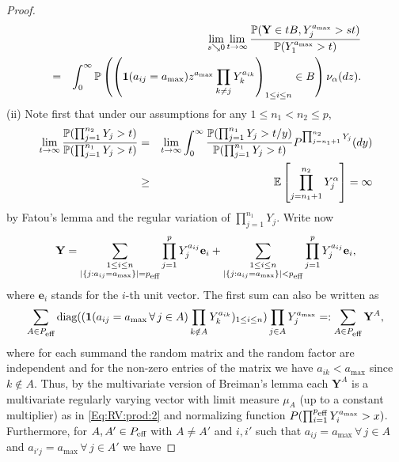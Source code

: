 \begin{proof}
\begin{eqnarray*}
&&
\lim_{s \searrow 0}\lim_{t \to \infty} \frac{{\mathbb P}(\mathbf{Y} \in tB, Y_j^{a_{\max}}>st)}{{\mathbb P}(Y_1^{a_{\max}}>t)} \\
&=&
\int_0^\infty {\mathbb P}\left(\left(\mathbf{1}(a_{ij}=a_{\max})z^{a_{\max}}\prod_{k \neq j}Y_k^{a_{ik}}\right)_{1 \leq i \leq n} \in B\right)
\nu_{\alpha}(dz).   
\end{eqnarray*}
(ii) Note first that under our assumptions for any $1\leq n_1 < n_2 \leq p$,
\begin{eqnarray}\nonumber \lim_{t \to \infty}\frac{{\mathbb P}(\prod_{j=1}^{n_2} Y_j>t)}{{\mathbb P}(\prod_{j=1}^{n_1} Y_j>t)}
\label{Eq:non:conv:equiv} &=& \lim_{t \to \infty} \int_0^\infty \frac{{\mathbb P}(\prod_{j=1}^{n_1} Y_j>t/y)}{{\mathbb P}(\prod_{j=1}^{n_1} Y_j>t)}P^{\prod_{j=n_1+1}^{n_2}Y_j}(dy)\\
&\geq& {\mathbb E}\left[\prod_{j=n_1+1}^{n_2}Y_j^\alpha\right]=\infty
\end{eqnarray}
by Fatou's lemma and the regular variation of $\prod_{j=1}^{n_1}Y_j$. Write now
\begin{equation}\label{Eq:split:sum}\mathbf{Y}=\sum_{\substack{1 \leq i \leq n \\ |\{j:a_{ij}=a_{\max}\}|=p_{\mbox{\scriptsize eff}}}} \prod_{j=1}^p Y_j^{a_{ij}} \mathbf{e}_i + \sum_{\substack{1 \leq i \leq n \\ |\{j:a_{ij}=a_{\max}\}|<p_{\mbox{\scriptsize eff}}}} \prod_{j=1}^p Y_j^{a_{ij}} \mathbf{e}_i,
\end{equation}
where $\mathbf{e}_i$ stands for the $i$-th unit vector. The first sum can also be written as
\begin{equation}\label{Eq:split:YA}\sum_{A \in P_{\mbox{\scriptsize eff}}}\mbox{diag}((\mathbf{1}(a_{ij}=a_{\max} \, \forall\, j \in A)\prod_{k \notin A}Y_k^{a_{ik}})_{1 \leq i \leq n})\prod_{j \in A}Y_j^{a_{\max}}=:\sum_{A \in P_{\mbox{\scriptsize eff}}}\mathbf{Y}^A, 
\end{equation}
where for each summand the random matrix and the random factor are independent and for the non-zero entries of the matrix we have $a_{ik}<a_{\max}$ since $k \notin A$. Thus, by the multivariate version of Breiman's lemma each $\mathbf{Y}^A$ is a multivariate regularly varying vector with limit measure $\mu_A$ (up to a constant multiplier) as in \eqref{Eq:RV:prod:2} and normalizing function $P(\prod_{i=1}^{p_{\mbox{\scriptsize eff}}}Y_i^{a_{\max}}>x)$. Furthermore, for $A, A' \in P_{\mbox{\scriptsize eff}}$ with $A \neq A'$ and $i,i'$ such that $a_{ij}=a_{\max} \, \forall\, j \in A$ and $a_{i'j}=a_{\max} \, \forall\, j \in A'$ we have

\end{proof}
